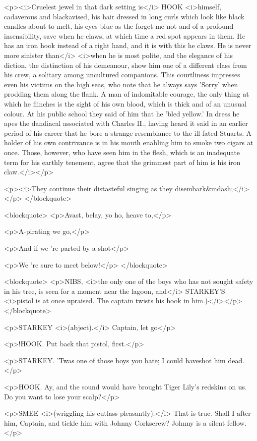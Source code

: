 <p><i>Cruelest jewel in that dark setting is</i> HOOK <i>himself, cadaverous and blackavised, his hair dressed in long curls which look like black candles about to melt, his eyes blue as the forget-me-not and of a profound insensibility, save when he claws, at which time a red spot appears in them. He has an iron hook instead of a right hand, and it is with this he claws. He is never more sinister than</i> <i>when he is most polite, and the elegance of his diction, the distinction of his demeanour, show him one of a different class from his crew, a solitary among uncultured companions. This courtliness impresses even his victims on the high seas, who note that he always says 'Sorry' when prodding them along the flank. A man of indomitable courage, the only thing at which he flinches is the sight of his own blood, which is thick and of an unusual colour. At his public school they said of him that he 'bled yellow.' In dress he apes the dandiacal associated with Charles II., having heard it said in an earlier period of his career that he bore a strange resemblance to the ill-fated Stuarts. A holder of his own contrivance is in his mouth enabling him to smoke two cigars at once. Those, however, who have seen him in the flesh, which is an inadequate term for his earthly tenement, agree that the grimmest part of him is his iron claw.</i></p>

<p><i>They continue their distasteful singing as they disembark&mdash;</i></p> </blockquote>

<blockquote> <p>Avast, belay, yo ho, heave to,</p>

<p>A-pirating we go,</p>

<p>And if we 're parted by a shot</p>

<p>We 're sure to meet below!</p> </blockquote>

<blockquote> <p>NIBS, <i>the only one of the boys who has not sought safety in his tree, is seen for a moment near the lagoon, and</i> STARKEY'S <i>pistol is at once upraised. The captain twists his hook in him.)</i></p> </blockquote>

<p>STARKEY <i>(abject).</i> Captain, let go</p>

<p>!HOOK. Put back that pistol, first.</p>

<p>STARKEY. 'Twas one of those boys you hate; I could haveshot him dead.</p>

<p>HOOK. Ay, and the sound would have brought Tiger Lily's redskins on us. Do you want to lose your scalp?</p>

<p>SMEE <i>(wriggling his cutlass pleasantly).</i> That is true. Shall I after him, Captain, and tickle him with Johnny Corkscrew? Johnny is a silent fellow.</p>

